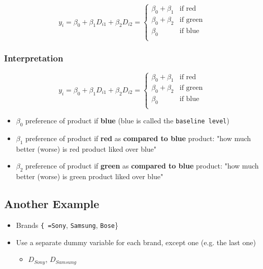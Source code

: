 \documentclass[10pt,article]{article}
\begin{document}
\[ y_i = \beta_0 + \beta_1 D_{i1} + \beta_2 D_{i2} = 
   \begin{cases} 
   \beta_0 + \beta_1 & \text{if red} \\
   \beta_0 + \beta_2 & \text{if green} \\
   \beta_0  & \text{if blue} \\
  \end{cases} \]

\subsubsection{Interpretation}
\label{sec:orgc51bebd}

\[ y_i = \beta_0 + \beta_1 D_{i1} + \beta_2 D_{i2} = 
   \begin{cases} 
   \beta_0 + \beta_1 & \text{if red} \\
   \beta_0 + \beta_2 & \text{if green} \\
   \beta_0  & \text{if blue} \\
  \end{cases} \]
\begin{itemize}
\item \(\beta_0\) preference of product if  {\bf blue} (blue is called the \texttt{baseline level})
\item \(\beta_1\) preference of product if  {\bf red} as  {\bf compared to blue} product:
"how much better (worse) is red product liked over blue"
\item \(\beta_2\) preference of product if  {\bf green} as  {\bf compared to blue} product:
"how much better (worse) is green product liked over blue"
\end{itemize}

\subsection{Another Example}
\label{sec:org4fc8f65}
\begin{itemize}
\item Brands \texttt{\{ =Sony}, \texttt{Samsung}, \texttt{Bose}\}

\item Use a separate dummy variable for each brand, except one (e.g. the last one)
\begin{itemize}
\item \(D_{Sony}\), \(D_{Samsung}\)
\end{itemize}
\end{itemize}
\end{document}
